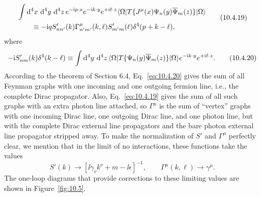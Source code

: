 \begin{equation}
\begin{split}
&\int \mathop{}\!\mathrm{d}^4x\,\mathop{}\!\mathrm{d}^4y\,\mathop{}\!\mathrm{d}^4z\,e^{-\mathrm{i} p\cdot x}e^{-\mathrm{i} k\cdot y}e^{+\mathrm{i}\ell\cdot z}
\langle \Omega\rvert T\{J^\mu(x)\Psi_n(y)\overline\Psi_m(z)\}\lvert \Omega\rangle
\\
&\qquad\equiv-\mathrm{i} qS'_{nn'}(k)\Gamma^\mu_{n'm'}(k,\ell)
S'_{m'm}(\ell)\delta^4(p+k-\ell),
\end{split}
\tag{10.4.19}\label{eq:10.4.19}
\end{equation}
where
\begin{equation}
-\mathrm{i} S'_{nm}(k)\delta^4(k-\ell)\equiv
\int \mathop{}\!\mathrm{d}^4y\,\mathop{}\!\mathrm{d}^4z\,
\langle \Omega\rvert T\{\Psi_n(y)\overline\Psi_m(z)\}\lvert \Omega\rangle
e^{-\mathrm{i} k\cdot y}e^{+\mathrm{i}\ell\cdot z}.
\tag{10.4.20}\label{eq:10.4.20}
\end{equation}
According to the theorem of Section 6.4, Eq.~\eqref{eq:10.4.20} gives the sum
of all Feynman graphs with one incoming and one outgoing fermion line, i.e.,
the complete Dirac propagator. Also, Eq.~\eqref{eq:10.4.19} gives the sum of
all such graphs with an extra photon line attached, so $\Gamma^\mu$ is the sum
of ``vertex'' graphs with one incoming Dirac line, one outgoing Dirac line,
and one photon line, but with the complete Dirac external line propagators and
the bare photon external line propagator stripped away. To make the
normalization of $S'$ and $\Gamma^\mu$ perfectly clear, we mention that in the
limit of no interactions, these functions take the values
\[
S'(k)\to[\ii\gamma_\nu k^\nu+m-\ii\epsilon]^{-1},
\qquad
\Gamma^\mu(k,\ell)\to\gamma^\mu.
\]
The one-loop diagrams that provide corrections to these limiting values are
shown in Figure~\ref{fig:10.5}.

